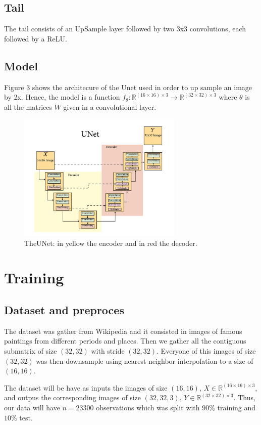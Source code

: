 \documentclass{article}
\theoremstyle{definition}
\begin{document}
\subsection{Tail}
The tail consists of an UpSample layer followed by two 3x3 convolutions, each followed by a ReLU.

\subsection{Model}
 Figure 3 shows the architecure of the Unet used in order to up sample an image by 2x. Hence, the model is a function $f_\theta:\mathbb{R}^{(16\times 16)\times 3}\rightarrow \mathbb{R}^{(32\times 32)\times 3}$ where $\theta$ is all the matrices $W$ given in a convolutional layer. 
\begin{figure}[h]
    \centering
    \includegraphics[width=0.7\textwidth]{Imagenes/Unet2.png}
    \caption{TheUNet: in yellow the encoder and in red the decoder.}
    \label{fig:mesh1}
\end{figure}

\section{Training}

\subsection{Dataset and preproces}
The dataset was gather from Wikipedia and it consisted in images of famous paintings from different periods and places. Then we gather all the contiguous submatrix of size $(32,32)$ with stride $(32,32)$. Everyone of this images of size $(32,32)$  was then downsample using nearest-neighbor interpolation to a size of $(16,16)$. 

\noindent
The dataset will be have as inputs the images of size $(16,16)$, $X\in\mathbb{R}^{(16\times 16)\times 3}$, and outpus the corresponding images of size $(32,32,3)$, $Y\in\mathbb{R}^{(32\times 32)\times 3}$. Thus, our data will have $n=23300$ observations which was split with $90\%$ training and $10\%$ test.
\end{document}
